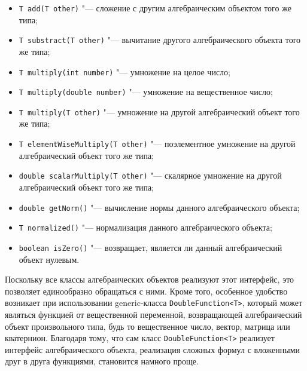 \begin{itemize}

\item \texttt{T add(T other)} "--- сложение с другим алгебраическим объектом того же типа;
\item \texttt{T substract(T other)} "--- вычитание другого алгебраического объекта того же типа;
\item \texttt{T multiply(int number)} "--- умножение на целое число;
\item \texttt{T multiply(double number)} "--- умножение на вещественное число;
\item \texttt{T multiply(T other)} "--- умножение на другой алгебраический объект того же типа;
\item \texttt{T elementWiseMultiply(T other)} "--- поэлементное умножение на другой алгебраический объект того же типа;
\item \texttt{double scalarMultiply(T other)} "--- скалярное умножение на другой алгебраический объект того же типа;
\item \texttt{double getNorm()} "--- вычисление нормы данного алгебраического объекта;
\item \texttt{T normalized()} "--- нормализация данного алгебраического объекта;
\item \texttt{boolean isZero()} "--- возвращает, является ли данный алгебраический объект нулевым.

\end{itemize}

Поскольку все классы алгебраических объектов реализуют этот интерфейс, это позволяет единообразно обращаться с ними.
Кроме того, особенное удобство возникает при использовании generic-класса \texttt{Double\-Function<T>}, который может
являться функцией от вещественной переменной, возвращающей алгебраический объект произвольного типа, будь то
вещественное число, вектор, матрица или кватернион. Благодаря тому, что сам класс \texttt{Double\-Function<T>}
реализует интерфейс алгебраического объекта, реализация сложных формул с вложенными друг в друга функциями, становится
намного проще.

